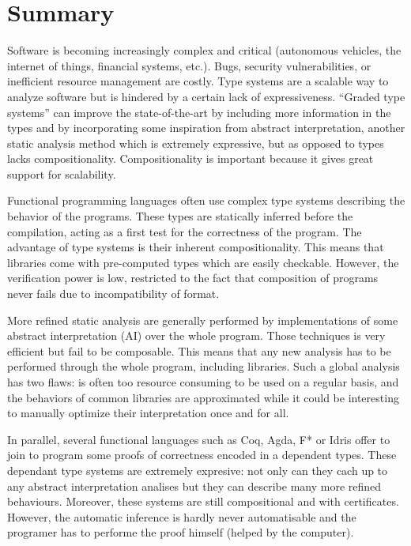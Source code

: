 \documentclass{article}[11pt]
\begin{document}
\vspace{15cm}



\newpage


\section{Summary}

Software is becoming increasingly complex and critical (autonomous vehicles, the internet of things, financial systems, etc.). Bugs, security vulnerabilities, or inefficient resource management are costly. Type systems are a scalable way to analyze software but is hindered by a certain lack of expressiveness. ``Graded type systems'' can improve the state-of-the-art by including more information in the types and by incorporating some inspiration from abstract interpretation, another static analysis method which is extremely expressive, but as opposed to types lacks compositionality. Compositionality is important because it gives great support for scalability.

Functional programming languages often use complex type systems describing the behavior of the programs. These types are statically inferred before the compilation, acting as a first test for the correctness of the program. The advantage of type systems is their inherent compositionality. This means that libraries come with pre-computed types which are easily checkable. However, the verification power is low, restricted to the fact that composition of programs never fails due to incompatibility of format.

More refined static analysis are generally performed by implementations of some abstract interpretation (AI) over the whole program. Those techniques is very efficient but fail to be composable. This means that any new analysis has to be performed through the whole program, including libraries. Such a global analysis has two flaws: is often too resource consuming to be used on a regular basis, and the behaviors of common libraries are approximated while it could be interesting to manually optimize their interpretation once and for all.

In parallel, several functional languages such as Coq, Agda, F* or Idris offer to join to program some proofs of correctness encoded in a dependent types. These dependant type systems are extremely expresive: not only can they cach up to any abstract interpretation analises but they can describe many more refined behaviours. Moreover, these systems are still compositional and with certificates. However, the automatic inference is hardly never automatisable and the programer has to performe the proof himself (helped by the computer).
\end{document}
